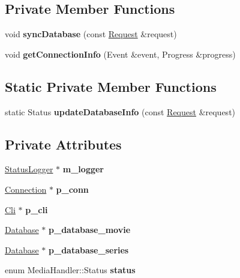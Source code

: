 \subsection*{Private Member Functions}
\begin{DoxyCompactItemize}
\item 
\mbox{\label{classMediaHandler_ad8e1965db78ff745b98cbd21384ac11f}} 
void {\bfseries sync\+Database} (const \hyperlink{classRequest}{Request} \&request)
\item 
\mbox{\label{classMediaHandler_a66c822377acfe8f8dcf3d1de6e15b742}} 
void {\bfseries get\+Connection\+Info} (Event \&event, Progress \&progress)
\end{DoxyCompactItemize}
\subsection*{Static Private Member Functions}
\begin{DoxyCompactItemize}
\item 
\mbox{\label{classMediaHandler_a6d000e049af4e966f14e131f94776ad0}} 
static Status {\bfseries update\+Database\+Info} (const \hyperlink{classRequest}{Request} \&request)
\end{DoxyCompactItemize}
\subsection*{Private Attributes}
\begin{DoxyCompactItemize}
\item 
\mbox{\label{classMediaHandler_a51ea5ce2402007e0f7071c7f15b1801a}} 
\hyperlink{classStatusLogger}{Status\+Logger} $\ast$ {\bfseries m\+\_\+logger}
\item 
\mbox{\label{classMediaHandler_aaf8cff20c4b878940dc7541634e8b0bc}} 
\hyperlink{classConnection}{Connection} $\ast$ {\bfseries p\+\_\+conn}
\item 
\mbox{\label{classMediaHandler_a2911148d911d30a1d440aca4b13277bf}} 
\hyperlink{classCli}{Cli} $\ast$ {\bfseries p\+\_\+cli}
\item 
\mbox{\label{classMediaHandler_a41a2bafa6e5b6b1de2f23e7a74581e91}} 
\hyperlink{classDatabase}{Database} $\ast$ {\bfseries p\+\_\+database\+\_\+movie}
\item 
\mbox{\label{classMediaHandler_aa79a92717b0ff21c5375a6eb107543cf}} 
\hyperlink{classDatabase}{Database} $\ast$ {\bfseries p\+\_\+database\+\_\+series}
\item 
\mbox{\label{classMediaHandler_a91120003da62a4022819235d391bd8b6}} 
enum Media\+Handler\+::\+Status {\bfseries status}
\end{DoxyCompactItemize}


